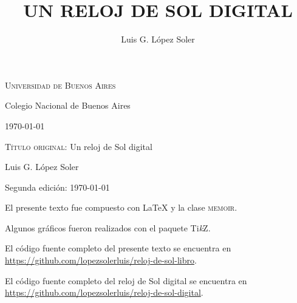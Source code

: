 \title{UN RELOJ DE SOL DIGITAL}
\author{Luis G. López Soler}
\newcommand{\uba}{Universidad de Buenos Aires}
\newcommand{\cnba}{Colegio Nacional de Buenos Aires}




\thispagestyle{empty}

\begin{center}
  
  {\Large \scshape  \uba
    
    \smallskip

    \cnba

  }


{\color{Sepia} \iftoggle{libro}{\HUGE}{\grande}
  \textsc{\thetitle}\par}


{ \Large \scshape  \theauthor \par }


{ \scshape  \mesdeanio\today \par}
  
\end{center}



\clearpage

\thispagestyle{empty}

{\small \setlength{\parindent}{0pt}

  \textsc{Título original:} Un reloj de Sol digital
  
  \textcopyleft{} Luis G. López Soler

  \bigskip
  
  Segunda edición: \mesdeanio\today
}

\vspace{.15\textheight}

{\small \setlength{\parindent}{0pt}

  El presente texto fue compuesto con \LaTeX{} y la clase
  \textsc{memoir}.

  Algunos gráficos fueron realizados con el paquete Ti\emph{k}Z.

  \bigskip \bigskip
  
  El código fuente completo del presente texto se encuentra en
  \url{https://github.com/lopezsolerluis/reloj-de-sol-libro}.

  \smallskip
  
  El código fuente completo del reloj de Sol digital se encuentra en
  \url{https://github.com/lopezsolerluis/reloj-de-sol-digital}.

}

